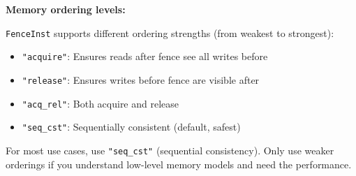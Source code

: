 \textbf{Memory ordering levels:}

\texttt{FenceInst} supports different ordering strengths (from weakest to strongest):
\begin{itemize}[noitemsep]
  \item \texttt{"acquire"}: Ensures reads after fence see all writes before
  \item \texttt{"release"}: Ensures writes before fence are visible after
  \item \texttt{"acq\_rel"}: Both acquire and release
  \item \texttt{"seq\_cst"}: Sequentially consistent (default, safest)
\end{itemize}

For most use cases, use \texttt{"seq\_cst"} (sequential consistency). Only use weaker orderings if you understand low-level memory models and need the performance.

